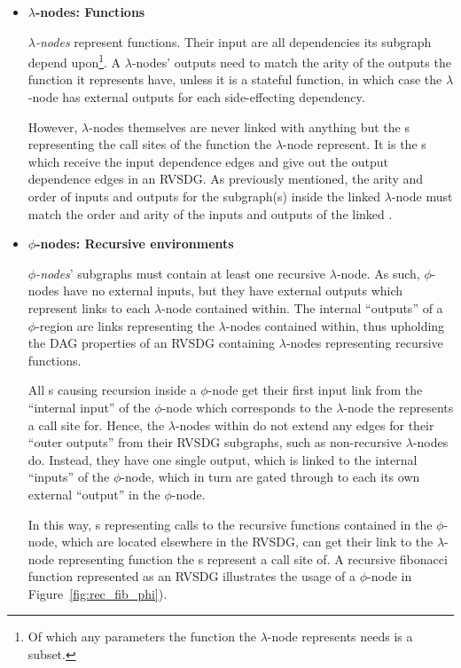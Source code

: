 \begin{itemize}
\clearpage
\item \textbf{$\lambda$-nodes: Functions}

\textit{$\lambda$-nodes} represent functions. Their input are all dependencies
its subgraph depend upon\footnote{Of which any parameters the function the
$\lambda$-node represents needs is a subset.}. A $\lambda$-nodes' outputs need
to match the arity of the outputs the function it represents have, unless it is
a stateful function, in which case the $\lambda$-node has external outputs for
each side-effecting dependency.

However, $\lambda$-nodes themselves are never linked with anything but the
\applyNode s representing the call sites of the function the $\lambda$-node
represent. It is the \applyNode s which receive the input dependence edges and
give out the output dependence edges in an RVSDG. As previously mentioned, the
arity and order of inputs and outputs for the subgraph(s) inside the linked
$\lambda$-node must match the order and arity of the inputs and outputs of the
linked \applyNode .

\item \textbf{$\phi$-nodes: Recursive environments}

\textit{$\phi$-nodes}' subgraphs must contain at least one recursive
$\lambda$-node. As such, $\phi$-nodes have no external inputs, but they have
external outputs which represent links to each $\lambda$-node contained within.
The internal ``outputs'' of a $\phi$-region are links representing the
$\lambda$-nodes contained within, thus upholding the DAG properties of an RVSDG containing $\lambda$-nodes representing recursive functions.

All \applyNode s causing recursion inside a $\phi$-node get their first input
link from the ``internal input'' of the $\phi$-node which corresponds to the
$\lambda$-node the \applyNode represents a call site for. Hence, the
$\lambda$-nodes within do not extend any edges for their ``outer outputs'' from
their RVSDG subgraphs, such as non-recursive $\lambda$-nodes do. Instead, they
have one single output, which is linked to the internal ``inputs'' of the
$\phi$-node, which in turn are gated through to each its own external ``output''
in the $\phi$-node.

In this way, \applyNode s representing calls to the recursive functions
contained in the $\phi$-node, which are located elsewhere in the RVSDG, can get
their link to the $\lambda$-node representing function the \applyNode s
represent a call site of. A recursive fibonacci function represented as an RVSDG
illustrates the usage of a $\phi$-node in Figure~\ref{fig:rec_fib_phi}).

\end{itemize}

